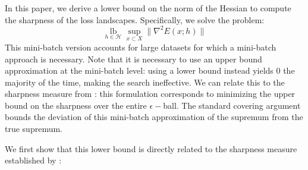 \documentclass[preprint,12pt]{elsarticle}
\makeatletter
\DeclareMathOperator*{\lb}{lb}
\DeclarePairedDelimiter\abs{\lvert}{\rvert}%
\DeclarePairedDelimiter\norm{\lVert}{\rVert}%
\let\oldabs\abs
\def\abs{\@ifstar{\oldabs}{\oldabs*}}
\let\oldnorm\norm
\def\norm{\@ifstar{\oldnorm}{\oldnorm*}}
\makeatother
\begin{document}
In this paper, we derive a lower bound on the norm of the Hessian to compute the sharpness of the loss landscapes. Specifically, we solve the problem: 
$$
	\lb\limits_{h \in \mathcal{H}}\sup\limits_{x \subset X} \lVert \nabla^2 E(x; h) \rVert
$$
This mini-batch version accounts for large datasets for which a mini-batch approach is necessary. Note that it is necessary to use an upper bound approximation at the mini-batch level: using a lower bound instead yields 0 the majority of the time, making the search ineffective. We can relate this to the sharpness measure from \citet{keskar2016large}: this formulation corresponds to minimizing the upper bound on the sharpness over the entire $\epsilon-$ball. The standard covering argument \cite{duchi2023} bounds the deviation of this mini-batch approximation of the supremum from the true supremum.

We first show that this lower bound is directly related to the sharpness measure established by \citet{keskar2016large}:
\end{document}
